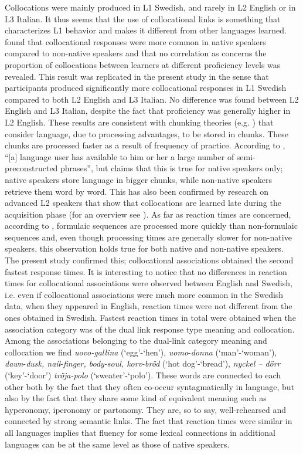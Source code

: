 \documentclass[output=paper,colorlinks,citecolor=brown,nonflat]{langsci/langscibook}
\begin{document}
Collocations were mainly produced in L1 Swedish, and rarely in L2 English or in L3 Italian. It thus seems that the use of collocational links is something that characterizes L1 behavior and makes it different from other languages learned. \citet{Fitzpatrick2006} found that collocational responses were more common in native speakers compared to non-native speakers and that no correlation as concerns the proportion of collocations between learners at different proficiency levels was revealed. This result was replicated in the present study in the sense that participants produced significantly more collocational responses in L1 Swedish compared to both L2 English and L3 Italian. No difference was found between L2 English and L3 Italian, despite the fact that proficiency was generally higher in L2 English. These results are consistent with chunking theories (e.g. \citealt{EllisN1996, Wray2002}) that consider language, due to processing advantages, to be stored in chunks. These chunks are processed faster as a result of frequency of practice. According to \citet[110]{Sinclair1991}, “[a] language user has available to him or her a large number of semi-preconstructed phrases”, but \citet{Wray2002} claims that this is true for native speakers only; native speakers store language in bigger chunks, while non-native speakers retrieve them word by word. This has also been confirmed by research on advanced L2 speakers that show that collocations are learned late during the acquisition phase (for an overview see \citealt{ErmanEtAl2016}). As far as reaction times are concerned, according to \citet[141]{ErmanEtAl2016}, formulaic sequences are processed more quickly than non-formulaic sequences and, even though processing times are generally slower for non-native speakers, this observation holds true for both native and non-native speakers. The present study confirmed this; collocational associations obtained the second fastest response times. It is interesting to notice that no differences in reaction times for collocational associations were observed between English and Swedish, i.e. even if collocational associations were much more common in the Swedish data, when they appeared in English, reaction times were not different from the ones obtained in Swedish. Fastest reaction times in total were obtained when the association category was of the dual link response type meaning and collocation. Among the associations belonging to the dual-link category meaning and collocation we find \textit{uovo-gallina} (‘egg’-‘hen’), \textit{uomo}{}-\textit{donna} (‘man’-‘woman’), \textit{dawn}{}-\textit{dusk, nail}{}-\textit{finger, body-soul, korv-bröd} (‘hot dog’-‘bread’), \textit{nyckel – dörr} (‘key’-‘door’) \textit{tröja-polo} (‘sweater’-‘polo’). These words are connected to each other both by the fact that they often co-occur syntagmatically in language, but also by the fact that they share some kind of equivalent meaning such as hyperonomy, iperonomy or partonomy. They are, so to say, well-rehearsed and connected by strong semantic links. The fact that reaction times were similar in all languages implies that fluency for some lexical connections in additional languages can be at the same level as those of native speakers.
\end{document}
